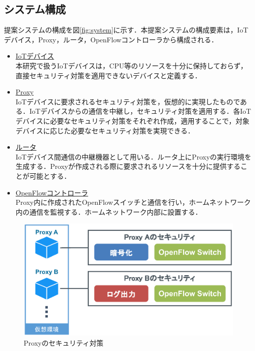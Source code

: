 \documentclass[Japanese]{dicomopapers}
\begin{document}
\subsection{システム構成}
提案システムの構成を図\ref{fig:system}に示す．本提案システムの構成要素は，IoTデバイス，Proxy，ルータ，OpenFlowコントローラから構成される．
\begin{itemize}
	\item \underline{IoTデバイス}\mbox{}\\
	      本研究で扱うIoTデバイスは，CPU等のリソースを十分に保持しておらず，直接セキュリティ対策を適用できないデバイスと定義する．
	\item \underline{Proxy}\mbox{}\\
	      IoTデバイスに要求されるセキュリティ対策を，仮想的に実現したものである．IoTデバイスからの通信を中継し，セキュリティ対策を適用する．各IoTデバイスに必要なセキュリティ対策をそれぞれ作成，適用することで，対象デバイスに応じた必要なセキュリティ対策を実現できる．
	\item \underline{ルータ}\mbox{}\\
	      IoTデバイス間通信の中継機器として用いる．ルータ上にProxyの実行環境を生成する．Proxyが作成される際に要求されるリソースを十分に提供することが可能とする．
	\item \underline{OpenFlowコントローラ}\mbox{}\\
	      Proxy内に作成されたOpenFlowスイッチと通信を行い，ホームネットワーク内の通信を監視する．ホームネットワーク内部に設置する．
\end{itemize}

\begin{figure}[!tb]
	\centering
	\includegraphics[width=\linewidth]{img/security.eps}
	\caption{Proxyのセキュリティ対策}
	\label{fig:security}
\end{figure}
\end{document}
